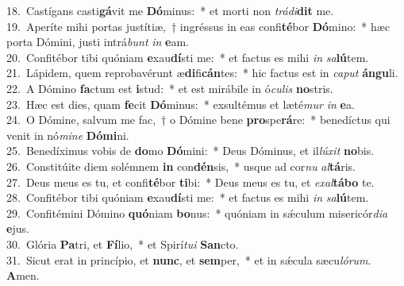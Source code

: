 {18.~}Castígans casti\textbf{gá}vit me \textbf{Dó}minus:~* et morti non \textit{trá}\textit{di}\textbf{dit} me.\\
{19.~}Aperíte mihi portas justítiæ,~† ingréssus in eas confi\textbf{té}bor \textbf{Dó}mino:~* hæc porta Dómini, justi intrá\textit{bunt} \textit{in} \textbf{e}am.\\
{20.~}Confitébor tibi quóniam \textbf{e}xau\textbf{dí}sti me:~* et factus es mihi \textit{in} \textit{sa}\textbf{lú}tem.\\
{21.~}Lápidem, quem reprobavérunt æ\textbf{di}fi\textbf{cán}tes:~* hic factus est in \textit{ca}\textit{put} \textbf{án}\textbf{gu}li.\\
{22.~}A Dómino \textbf{fa}ctum est \textbf{i}stud:~* et est mirábile in ó\textit{cu}\textit{lis} \textbf{no}stris.\\
{23.~}Hæc est dies, quam \textbf{fe}cit \textbf{Dó}minus:~* exsultémus et læté\textit{mur} \textit{in} \textbf{e}a.\\
{24.~}O Dómine, salvum me fac,~† o Dómine bene \textbf{pro}spe\textbf{rá}re:~* benedíctus qui venit in nó\textit{mi}\textit{ne} \textbf{Dó}\textbf{mi}ni.\\
{25.~}Benedíximus vobis de \textbf{do}mo \textbf{Dó}mini:~* Deus Dóminus, et il\textit{lú}\textit{xit} \textbf{no}bis.\\
{26.~}Constitúite diem solémnem \textbf{in} con\textbf{dén}sis,~* usque ad cor\textit{nu} \textit{al}\textbf{tá}ris.\\
{27.~}Deus meus es tu, et confi\textbf{té}bor \textbf{ti}bi:~* Deus meus es tu, et \textit{e}\textit{xal}\textbf{tá}\textbf{bo} te.\\
{28.~}Confitébor tibi quóniam \textbf{e}xau\textbf{dí}sti me:~* et factus es mihi \textit{in} \textit{sa}\textbf{lú}tem.\\
{29.~}Confitémini Dómino \textbf{quó}niam \textbf{bo}nus:~* quóniam in sǽculum misericór\textit{di}\textit{a} \textbf{e}jus.\\
{30.~}Glória \textbf{Pa}tri, et \textbf{Fí}lio,~* et Spirí\textit{tu}\textit{i} \textbf{San}cto.\\
{31.~}Sicut erat in princípio, et \textbf{nunc}, et \textbf{sem}per,~* et in sǽcula sæcu\textit{ló}\textit{rum}. \textbf{A}men.\\
